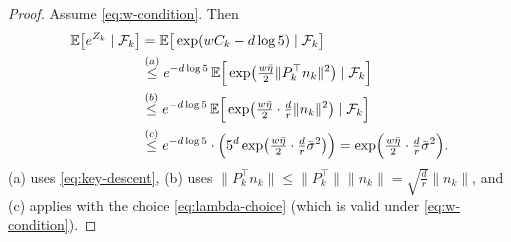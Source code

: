 \documentclass[10pt]{article}
\begin{document}
\begin{proof}
Assume \eqref{eq:w-condition}. Then
\begin{align}
\mathbb{E}\big[e^{Z_k}\mid \mathcal{F}_k\big]
&= \mathbb{E}\big[\exp(wC_k-d\log 5)\mid \mathcal{F}_k\big] \notag\\
&\overset{(a)}{\le}
e^{-d\log 5}\,
\mathbb{E}\Big[\exp\!\big(\tfrac{w\bar{\eta}}{2}\|P_k^\top n_k\|^2\big)\mid \mathcal{F}_k\Big] \notag\\
&\overset{(b)}{\le}
e^{-d\log 5}\,
\mathbb{E}\Big[\exp\!\big(\tfrac{w\bar{\eta}}{2}\cdot\tfrac{d}{r}\|n_k\|^2\big)\mid \mathcal{F}_k\Big] \notag\\
&\overset{(c)}{\le}
e^{-d\log 5}\cdot
\Big(5^d\exp\!\big(\tfrac{w\bar{\eta}}{2}\cdot\tfrac{d}{r}\bar{\sigma}^2\big)\Big)
=
\exp\!\Big(\tfrac{w\bar{\eta}}{2}\cdot\tfrac{d}{r}\bar{\sigma}^2\Big).
\label{eq:expZ}
\end{align}
(a)\; uses \eqref{eq:key-descent},
(b)\; uses $\|P_k^\top n_k\|\le \|P_k^\top\|\|n_k\|=\sqrt{\frac{d}{r}}\|n_k\|$, and
(c)\; applies  with the choice \eqref{eq:lambda-choice}
(which is valid under \eqref{eq:w-condition}).


\end{proof}
\end{document}
